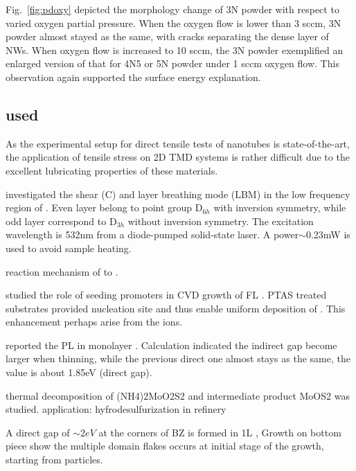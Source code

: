 Fig.~\ref{fig:pdoxy} depicted the morphology change of 3N powder with respect to varied oxygen partial pressure. When the oxygen flow is lower than 3 sccm, 3N powder almost stayed as the same, with cracks separating the dense layer of NWs. When oxygen flow is increased to 10 sccm, the 3N powder exemplified an enlarged version of that for 4N5 or 5N powder under 1 sccm oxygen flow. This observation again supported the surface energy explanation.

\subsection{used}

As the experimental setup for direct tensile tests of nanotubes is state-of-the-art,\cite{Tang2013} the application of tensile stress on 2D TMD systems is rather difficult due to the excellent lubricating properties of these materials.

\citeauthor{Zhang2013e} investigated the shear (C) and layer breathing mode (LBM) in the low frequency region of .\cite{Zhang2013e} Even layer  belong to point group D$_{6h}$ with inversion symmetry, while odd layer  correspond to D$_{3h}$ without inversion symmetry. The excitation wavelength is 532nm from a diode-pumped solid-state laser. A power$\sim$0.23mW is used to avoid sample heating.

reaction mechanism of  to .\cite{Weber1996}

\citeauthor{Ling2014} studied the role of seeding promoters in CVD growth of FL .\cite{Ling2014} PTAS treated substrates provided nucleation site and thus enable uniform deposition of .  This enhancement perhaps arise from the  ions.

\citeauthor{Splendiani2010} reported the PL in monolayer .  Calculation indicated the indirect gap become larger when thinning, while the previous direct one almost stays as the same, the value is about 1.85eV (direct gap).\cite{Splendiani2010}

thermal decomposition of (NH4)2MoO2S2 and intermediate product MoOS2 was studied. application: hyfrodesulfurization in refinery \cite{Weber1996}

 \cite{Stoffels1999}

A direct gap of $\sim 2eV$ at the corners of BZ is formed in 1L , Growth on bottom piece show the multiple domain flakes occurs at initial stage of the growth, starting from  particles.\cite{Cong2013}


